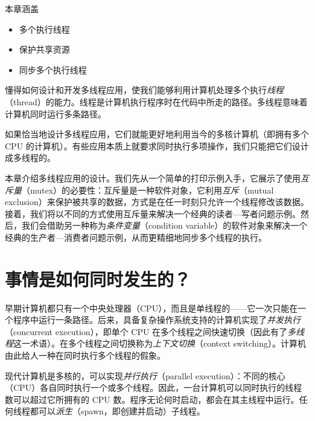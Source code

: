 \begin{myChapterIntro}{本章涵盖}
\begin{itemize}
\item 多个执行线程
\item 保护共享资源
\item 同步多个执行线程
\end{itemize}
\end{myChapterIntro}

懂得如何设计和开发多线程应用，使我们能够利用计算机处理多个执行\emph{线程}（thread）的能力。线程是计算机执行程序时在代码中所走的路径。多线程意味着计算机同时运行多条路径。

如果恰当地设计多线程应用，它们就能更好地利用当今的多核计算机（即拥有多个 CPU 的计算机）。有些应用本质上就要求同时执行多项操作，我们只能把它们设计成多线程的。


本章介绍多线程应用的设计。我们先从一个简单的打印示例入手，它展示了使用\emph{互斥量}（mutex）的必要性：互斥量是一种软件对象，它利用\emph{互斥}（mutual exclusion）来保护被共享的数据，方式是在任一时刻只允许一个线程修改该数据。接着，我们将以不同的方式使用互斥量来解决一个经典的读者—写者问题示例。然后，我们会借助另一种称为\emph{条件变量}（condition variable）的软件对象来解决一个经典的生产者—消费者问题示例，从而更精细地同步多个线程的执行。

\section{事情是如何同时发生的？}

早期计算机都只有一个中央处理器（CPU），而且是单线程的——它一次只能在一个程序中运行一条路径。后来，具备复杂操作系统支持的计算机实现了\emph{并发执行}（concurrent execution），即单个 CPU 在多个线程之间快速切换（因此有了\emph{多线程}这一术语）。在多个线程之间切换称为\emph{上下文切换}（context switching）。计算机由此给人一种在同时执行多个线程的假象。

现代计算机是多核的，可以实现\emph{并行执行}（parallel execution）：不同的核心（CPU）各自同时执行一个或多个线程。因此，一台计算机可以同时执行的线程数可以超过它所拥有的 CPU 数。程序无论何时启动，都会在其主线程中运行。任何线程都可以\emph{派生}（spawn，即创建并启动）子线程。

